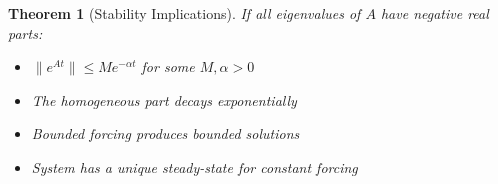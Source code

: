 \documentclass[12pt]{article}
\newtheorem{theorem}{Theorem}
\begin{document}
\begin{theorem}[Stability Implications]
If all eigenvalues of $A$ have negative real parts:
\begin{itemize}
\item $\|e^{At}\| \leq Me^{-\alpha t}$ for some $M, \alpha > 0$
\item The homogeneous part decays exponentially
\item Bounded forcing produces bounded solutions
\item System has a unique steady-state for constant forcing
\end{itemize}
\end{theorem}
\end{document}
